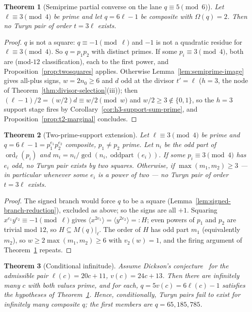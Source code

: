 \documentclass[11pt]{article}
\theoremstyle{plain}
\newtheorem{theorem}{Theorem}[section]
\theoremstyle{definition}
\theoremstyle{remark}
\newcommand{\ord}{\operatorname{ord}}
\begin{document}
\begin{theorem}[Semiprime partial converse on the lane
$q\equiv5\pmod6$]\label{thm:semiprime-converse}
Let $\ell\equiv3\pmod4$ be prime and let $q=6\ell-1$ be composite with
$\Omega(q)=2$.  Then no Turyn pair of order $t=3\ell$ exists.
\end{theorem}

\begin{proof}
$q$ is not a square: $q\equiv-1\pmod\ell$ and $-1$ is not a quadratic
residue for $\ell\equiv3\pmod4$.  So $q=p_1p_2$ with distinct primes.
If some $p_i\equiv3\pmod4$, both are (mod-$12$ classification), each to
the first power, and Proposition~\ref{prop:twosquares} applies.
Otherwise Lemma~\ref{lem:semiprime-image} gives all-plus signs,
$w=2n_0\ge6$ and $d$ odd at the divisor $t'=\ell$ ($h=3$, the node of
Theorem~\ref{thm:divisor-selection}(iii)); then
$(\ell-1)/2=(w/2)d\equiv w/2\pmod w$ and $w/2\ge3\notin\{0,1\}$, so the
$h=3$ support stage fires by
Corollary~\ref{cor:h3-support-sum-prime}, and
Proposition~\ref{prop:t2-marginal} concludes.
\end{proof}

\begin{theorem}[Two-prime-support extension]\label{thm:omega2-converse}
Let $\ell\equiv3\pmod4$ be prime and
$q=6\ell-1=p_1^{e_1}p_2^{e_2}$ composite, $p_1\ne p_2$ prime.  Let
$n_i$ be the odd part of $\ord_\ell(p_i)$ and
$m_i=n_i/\gcd(n_i,\operatorname{oddpart}(e_i))$.  If some
$p_i\equiv3\pmod4$ has $e_i$ odd, no Turyn pair exists by two squares.
Otherwise, if $\max(m_1,m_2)\ge3$ --- in particular whenever some $e_i$
is a power of two --- no Turyn pair of order $t=3\ell$ exists.
\end{theorem}

\begin{proof}
The signed branch would force $q$ to be a square
(Lemma~\ref{lem:signed-branch-reduction}), excluded as above; so the
signs are all $+1$.  Squaring $x^{e_1}y^{e_2}\equiv-1\pmod\ell$ gives
$\langle x^{2e_1}\rangle=\langle y^{2e_2}\rangle=:H$; even powers of
$p_1$ and $p_2$ are trivial mod $12$, so $H\subseteq M(q)|_\ell$.  The
order of $H$ has odd part $m_1$ (equivalently $m_2$), so
$w\ge2\max(m_1,m_2)\ge6$ with $v_2(w)=1$, and the firing argument of
Theorem~\ref{thm:semiprime-converse} repeats.
\end{proof}

\begin{theorem}[Conditional infinitude]\label{thm:dickson-family}
Assume Dickson's conjecture~\cite{Dickson04} for the admissible pair
$\ell(c)=20c+11$, $v(c)=24c+13$.  Then there are infinitely many $c$
with both values prime, and for each, $q=5v(c)=6\ell(c)-1$ satisfies
the hypotheses of Theorem~\ref{thm:semiprime-converse}.  Hence,
conditionally, Turyn pairs fail to exist for infinitely many composite
$q$; the first members are $q=65,185,785$.
\end{theorem}
\end{document}
